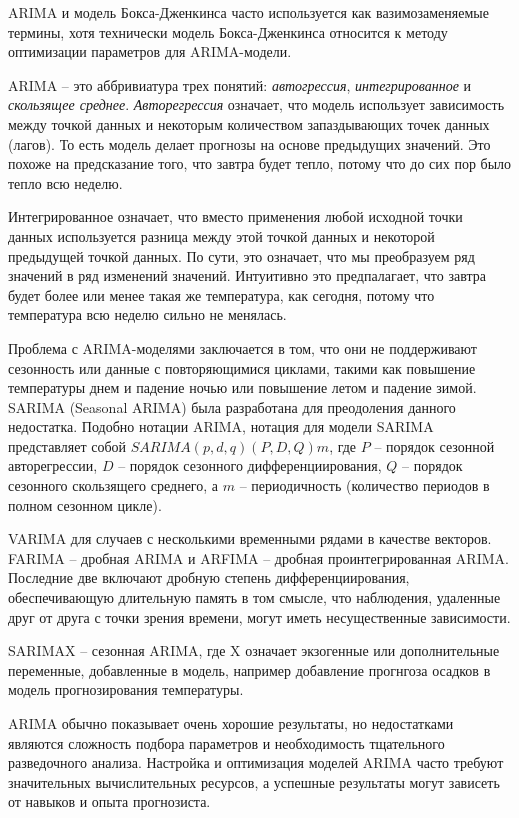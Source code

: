 \documentclass[%
	11pt,
	a4paper,
	utf8,
		]{article}
\begin{document}
ARIMA и модель Бокса-Дженкинса часто используется как вазимозаменяемые термины, хотя технически модель Бокса-Дженкинса относится к методу оптимизации параметров для ARIMA-модели.

ARIMA -- это аббривиатура трех понятий: \emph{автогрессия}, \emph{интегрированное} и \emph{скользящее среднее}. \emph{Авторегрессия} означает, что модель использует зависимость между точкой данных и некоторым количеством запаздывающих точек данных (лагов). То есть модель делает прогнозы на основе предыдущих значений. Это похоже на предсказание того, что завтра будет тепло, потому что до сих пор было тепло всю неделю.

Интегрированное означает, что вместо применения любой исходной точки данных используется разница между этой точкой данных и некоторой предыдущей точкой данных. По сути, это означает, что мы преобразуем ряд значений в ряд изменений значений. Интуитивно это предпалагает, что завтра будет более или менее такая же температура, как сегодня, потому что температура всю неделю сильно не менялась.

Проблема с ARIMA-моделями заключается в том, что они не поддерживают сезонность или данные с повторяющимися циклами, такими как повышение температуры днем и падение ночью или повышение летом и падение зимой. SARIMA (Seasonal ARIMA) была разработана для преодоления данного недостатка. Подобно нотации ARIMA, нотация для модели SARIMA представляет собой $SARIMA(p,d,q)(P, D, Q)m$, где $P$ -- порядок сезонной авторегрессии, $D$ -- порядок сезонного дифференциирования, $Q$ -- порядок сезонного скользящего среднего, а $m$ -- периодичность (количество периодов в полном сезонном цикле).

VARIMA для случаев с несколькими временными рядами в качестве векторов. FARIMA -- дробная ARIMA и ARFIMA -- дробная проинтегрированная ARIMA. Последние две включают дробную степень дифференциирования, обеспечивающую длительную память в том смысле, что наблюдения, удаленные друг от друга с точки зрения времени, могут иметь несущественные зависимости.

SARIMAX -- сезонная ARIMA, где X означает экзогенные или дополнительные переменные, добавленные в модель, например добавление прогнгоза осадков в модель прогнозирования температуры. 

ARIMA обычно показывает очень хорошие результаты, но недостатками являются сложность подбора параметров и необходимость тщательного разведочного анализа. Настройка и оптимизация моделей ARIMA часто требуют значительных вычислительных ресурсов, а успешные результаты могут зависеть от навыков и опыта прогнозиста. 
\end{document}
